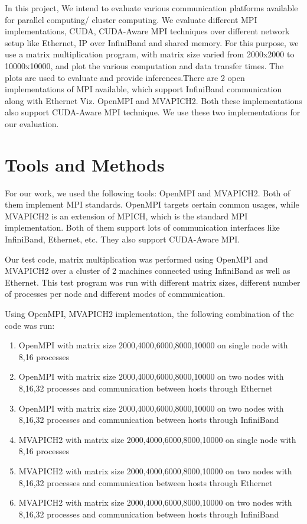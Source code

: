\documentclass[10pt]{article}
\begin{document}
In this project, We intend to evaluate various communication platforms available for parallel computing/ cluster computing. We evaluate different MPI implementations, CUDA, CUDA-Aware MPI techniques over different network setup like Ethernet, IP over InfiniBand and shared memory. For this purpose, we use a matrix multiplication program, with matrix size varied from 2000x2000 to 10000x10000, and plot the various computation and data transfer times. The plots are used to evaluate and provide inferences.There are 2 open implementations of MPI available, which support InfiniBand communication along with Ethernet Viz. OpenMPI and MVAPICH2. Both these implementations also support CUDA-Aware MPI technique. We use these two implementations for our evaluation.


\section{Tools and Methods}
\label{methods}

For our work, we used the following tools: OpenMPI and MVAPICH2.
Both of them implement MPI standards. OpenMPI targets certain common usages, while MVAPICH2 is an extension of MPICH, which is the standard MPI implementation. Both of them support lots of communication interfaces like InfiniBand, Ethernet, etc. They also support CUDA-Aware MPI.






Our test code, matrix multiplication was performed using OpenMPI and MVAPICH2 over a cluster of 2 machines connected using InfiniBand as well as Ethernet. This test program was run with different matrix sizes, different number of processes per node and different modes of communication.

Using OpenMPI, MVAPICH2 implementation, the following combination of the code was run:
\begin{enumerate}
\item OpenMPI with matrix size 2000,4000,6000,8000,10000 on single node with 8,16 processes
\item OpenMPI with matrix size 2000,4000,6000,8000,10000 on two nodes with 8,16,32 processes and communication between hosts through Ethernet
\item OpenMPI with matrix size 2000,4000,6000,8000,10000 on two nodes with 8,16,32 processes and communication between hosts through InfiniBand
\item MVAPICH2 with matrix size 2000,4000,6000,8000,10000 on single node with 8,16 processes
\item MVAPICH2 with matrix size 2000,4000,6000,8000,10000 on two nodes with 8,16,32 processes and communication between hosts through Ethernet
\item MVAPICH2 with matrix size 2000,4000,6000,8000,10000 on two nodes with 8,16,32 processes and communication between hosts through InfiniBand
\end{enumerate}
\end{document}

